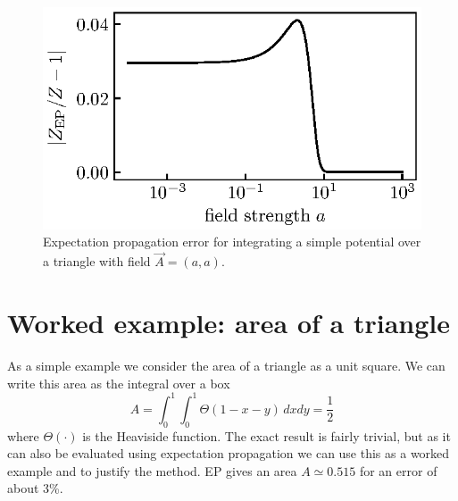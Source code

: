 \documentclass[11pt,twoside]{report}
\begin{document}
\begin{figure}
  \includegraphics[width=0.9\linewidth,outer]{ep-errors}
  \caption[Errors in expectation propagation for integration over a triangle]{
    Expectation propagation error for integrating a simple potential over a triangle with field $\vec{A} = (a, a)$.
  }
  \label{fig:ep-errors}
\end{figure}

\section{Worked example: area of a triangle}

As a simple example we consider the area of a triangle as a unit square.
We can write this area as the integral over a box
\begin{equation}
  A = \int_0^1 \int_0^1 \Theta(1 - x - y) \, dx dy
  = \frac{1}{2}
\end{equation}
where $\Theta(\cdot)$ is the Heaviside function.
The exact result is fairly trivial, but as it can also be evaluated using expectation propagation we can use this as a worked example and to justify the method.
EP gives an area $A \simeq 0.515$ for an error of about 3\%.
\end{document}
